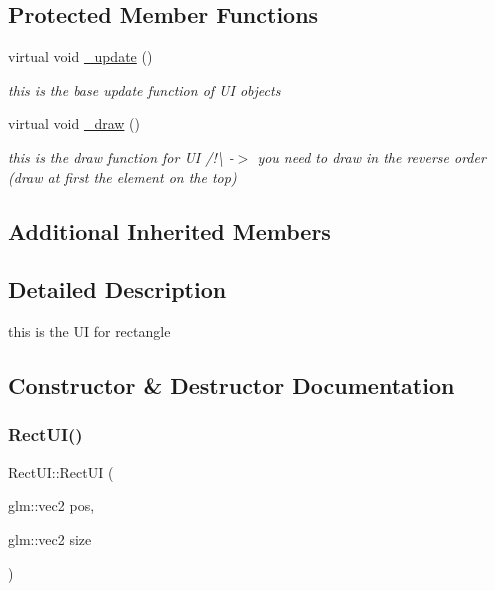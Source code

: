 \subsection*{Protected Member Functions}
\begin{DoxyCompactItemize}
\item 
\mbox{\label{class_rect_u_i_af35d2c8c63747ef097d0337331f18164}} 
virtual void \hyperlink{class_rect_u_i_af35d2c8c63747ef097d0337331f18164}{\+\_\+update} ()
\begin{DoxyCompactList}\small\item\em this is the base update function of UI objects \end{DoxyCompactList}\item 
\mbox{\label{class_rect_u_i_a5ad42f50efc75d1f2f516380d1aaaee8}} 
virtual void \hyperlink{class_rect_u_i_a5ad42f50efc75d1f2f516380d1aaaee8}{\+\_\+draw} ()
\begin{DoxyCompactList}\small\item\em this is the draw function for UI /!\textbackslash{} -\/$>$ you need to draw in the reverse order (draw at first the element on the top) \end{DoxyCompactList}\end{DoxyCompactItemize}
\subsection*{Additional Inherited Members}


\subsection{Detailed Description}
this is the UI for rectangle 

\subsection{Constructor \& Destructor Documentation}
\mbox{\label{class_rect_u_i_af6d1044dfd341d4f662527c56556a2b2}} 
\subsubsection{\texorpdfstring{Rect\+U\+I()}{RectUI()}\hspace{0.1cm}{\footnotesize\ttfamily [1/2]}}
{\footnotesize\ttfamily Rect\+U\+I\+::\+Rect\+UI (\begin{DoxyParamCaption}\item[{glm\+::vec2}]{pos,  }\item[{glm\+::vec2}]{size }\end{DoxyParamCaption})}



